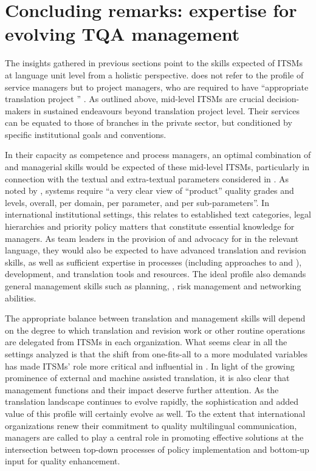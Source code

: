 \documentclass[output=paper]{langsci/langscibook}
\begin{document}
\section{Concluding remarks: expertise for evolving TQA management}\label{sec:prietoramos:4}


The insights gathered in previous sections point to the skills expected of ITSMs at language unit level from a holistic  perspective. \citeauthor{ISO2015} does not refer to the profile of service managers but to  project managers, who are required to have “appropriate translation project ” \citep[7]{ISO2015}. As outlined above, mid-level ITSMs are crucial decision-makers in sustained  endeavours beyond translation project level. Their services can be equated to those of  branches in the private sector, but conditioned by specific institutional goals and conventions. 

In their capacity as competence and process managers, an optimal combination of  and managerial skills would be expected of these mid-level ITSMs, particularly in connection with the textual and extra-textual parameters considered in . As noted by \citet[275]{Gouadec2010},  systems require “a very clear view of “product” quality grades and levels, overall, per domain, per parameter, and per sub-parameters”. In international institutional settings, this relates to established text categories, legal hierarchies and priority policy matters that constitute essential knowledge for  managers. As team leaders in the provision of and advocacy for  in the relevant language, they would also be expected to have advanced translation and revision skills, as well as sufficient expertise in  processes (including approaches to  and ),  development, and translation tools and resources. The ideal  profile also demands general management skills such as planning, , risk management and networking abilities.

The appropriate balance between translation and management skills will depend on the degree to which translation and revision work or other routine operations are delegated from ITSMs in each organization. What seems clear in all the settings analyzed is that the shift from one-fits-all  to a more modulated  variables has made ITSMs’ role more critical and influential in . In light of the growing prominence of external and machine assisted translation, it is also clear that  management functions and their impact deserve further attention. As the translation landscape continues to evolve rapidly, the sophistication and added value of this profile will certainly evolve as well. To the extent that international organizations renew their commitment to quality multilingual communication,  managers are called to play a central role in promoting effective solutions at the intersection between top-down processes of policy implementation and bottom-up input for quality enhancement.  
\end{document}

